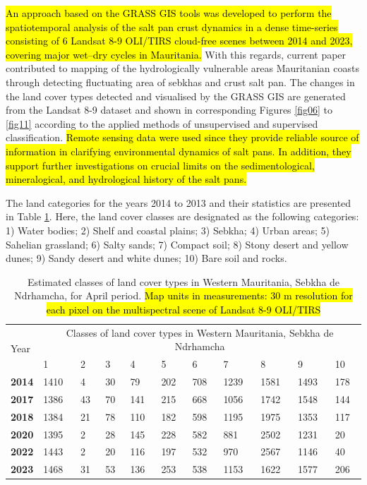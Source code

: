 \documentclass[12pt,a4paper,oneside]{article}
\def \newpar{\vspace{6pt}}
\begin{document}
\newpar \hl{An approach based on the GRASS GIS tools was developed to perform the spatiotemporal analysis of the salt pan crust dynamics in a dense time-series consisting of 6 Landsat 8-9 OLI/TIRS cloud-free scenes between 2014 and 2023, covering major wet--dry cycles in Mauritania. }With this regards, current paper contributed to mapping of the hydrologically vulnerable  areas Mauritanian coasts through detecting fluctuating area of sebkhas and crust salt pan. The changes in the land cover types detected and visualised by the GRASS GIS are generated from the Landsat 8-9 dataset and shown in corresponding Figures\hl{ }\ref{fig06} to \ref{fig11} according to the applied methods of unsupervised and supervised classification. \hl{Remote sensing data were used since they provide reliable source of information in clarifying  environmental dynamics of salt pans. In addition, they support further investigations on crucial limits on the sedimentological, mineralogical, and hydrological history of the salt pans.}

The land categories for the years 2014 to 2013 and their statistics are presented in Table \ref{tab3}. Here, the land cover classes are designated as the following categories: 1) Water bodies; 2) Shelf and coastal plains; 3) Sebkha; 4) Urban areas; 5) Sahelian grassland; 6) Salty sands; 7) Compact soil; 8) Stony desert and yellow dunes; 9) Sandy desert and white dunes; 10) Bare soil and rocks. 

\begin{table}[H]
\caption{Estimated classes of land cover types in Western Mauritania, Sebkha de Ndrhamcha, for April period. \hl{Map units in measurements: 30 m resolution for each pixel on the multispectral scene of Landsat 8-9 OLI/TIRS}}
  \centering
  \begin{tabularx}{\textwidth}{p{0.9cm}p{0.9cm}p{0.9cm}p{0.9cm}p{0.9cm}p{0.9cm}p{0.9cm}p{0.9cm}p{0.9cm}p{0.9cm}p{0.9cm}}
  \toprule
  \multirow{2}{*}{Year} & \multicolumn{10}{c}{Classes of land cover types in Western Mauritania, Sebkha de Ndrhamcha} \\
     & 1 & 2 & 3 & 4 & 5 & 6 & 7 & 8 & 9 & 10 \\
    \midrule
    \textbf{2014} & 1410 & 4 & 30 & 79 & 202 & 708 & 1239 & 1581 & 1493 & 178 \\
    
    \textbf{2017} & 1386 & 43 & 70 & 141 & 215 & 668 & 1056 & 1742 & 1548 & 144 \\
    \textbf{2018} & 1384 & 21 & 78 & 110 & 182 & 598 & 1195 & 1975 & 1353 & 117 \\
    \textbf{2020} & 1395 & 2 & 28 & 145 & 228 & 582 & 881 & 2502 & 1231 & 20 \\
    \textbf{2022} & 1443 & 2 & 20 & 116 & 197 & 532 & 970 & 2567 & 1146 & 40 \\
    \textbf{2023} & 1468 & 31 & 53 & 136 & 253 & 538 & 1153 & 1622 & 1577 & 206 \\
\bottomrule
\end{tabularx}
  \label{tab3}
\end{table}
\end{document}
